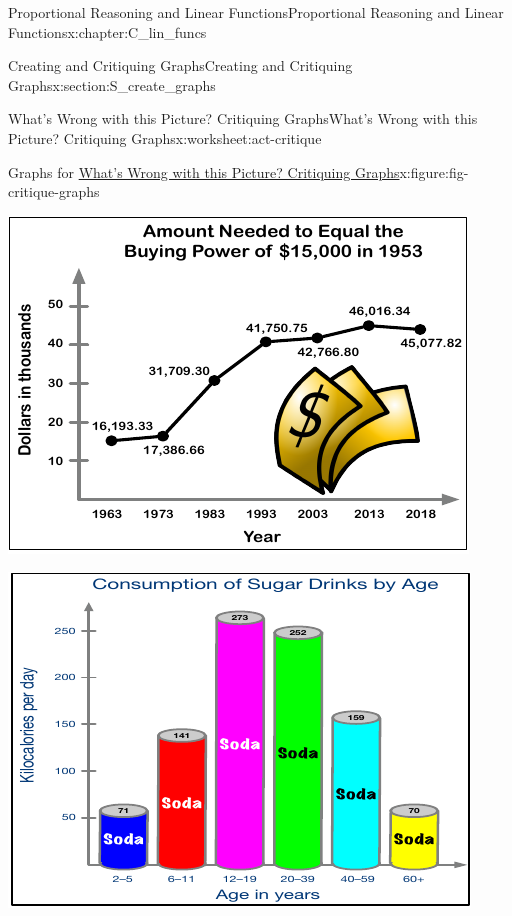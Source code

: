 \documentclass[oneside,10pt,]{book}
\numberwithin{equation}{chapter}
\begin{document}
\begin{chapterptx}{Proportional Reasoning and Linear Functions}{}{Proportional Reasoning and Linear Functions}{}{}{x:chapter:C_lin_funcs}
\begin{sectionptx}{Creating and Critiquing Graphs}{}{Creating and Critiquing Graphs}{}{}{x:section:S_create_graphs}
\begin{worksheet-subsection}{What's Wrong with this Picture? Critiquing Graphs}{}{What's Wrong with this Picture? Critiquing Graphs}{}{}{x:worksheet:act-critique}
\begin{introduction}{}
\begin{figureptx}{Graphs for \hyperref[x:worksheet:act-critique]{What's Wrong with this Picture? Critiquing Graphs}}{x:figure:fig-critique-graphs}{}%
\centering
\begin{sidebyside}{2}{0}{0}{0}%
\begin{sbspanel}{0.5}%
\includegraphics[width=\linewidth]{external/critique-graph1.pdf}
\end{sbspanel}%
\begin{sbspanel}{0.5}%
\includegraphics[width=\linewidth]{external/critique-graph2.pdf}
\end{sbspanel}%
\end{sidebyside}%
\begin{sidebyside}{2}{0}{0}{0}%
\begin{sbspanel}{0.5}%

\end{sbspanel}
\end{sidebyside}
\end{figureptx}
\end{introduction}
\end{worksheet-subsection}
\end{sectionptx}
\end{chapterptx}
\end{document}
